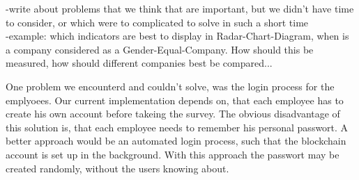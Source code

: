 -write about problems that we think that are important, but we didn't have time to consider, or which were to complicated to solve in such a short time\\
-example: which indicators are best to display in Radar-Chart-Diagram, when is a company considered as a Gender-Equal-Company. How should this be measured, how should different companies best be compared...

One problem we encounterd and couldn't solve, was the login process for the emplyoees. Our current implementation depends on, that each employee has to create his own account before takeing the survey.
The obvious disadvantage of this solution is, that each employee needs to remember his personal passwort. A better approach would be an automated login process, such that the blockchain account is set up in the
background. With this approach the passwort may be created randomly, without the users knowing about.\\

